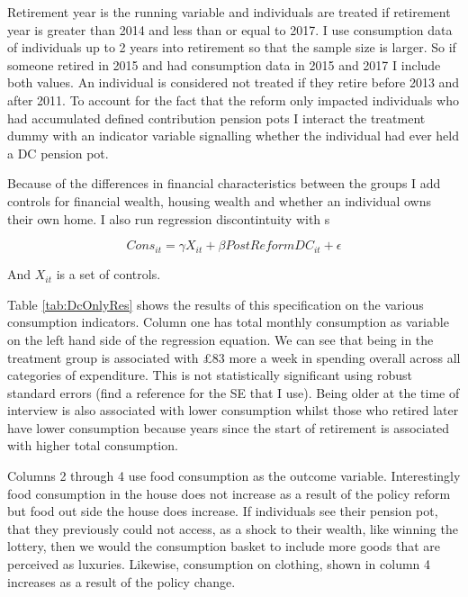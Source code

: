 \documentclass[12pt]{article}
\begin{document}
Retirement year is the running variable and individuals are treated if retirement year is greater than 2014 and less than
or equal to 2017. I use consumption data of individuals up to 2 years into retirement so that the sample size is larger.
So if someone retired in 2015 and had consumption data in 2015 and 2017 I include both values. An individual is considered
not treated if they retire before 2013 and after 2011.  To account for the fact
that the reform only impacted individuals who had accumulated defined contribution pension pots I interact the treatment dummy with
an indicator variable signalling whether the individual had ever held a DC pension pot.

Because of the differences in financial characteristics between the groups I add controls for financial wealth, housing wealth
and whether an individual owns their own home. I also run regression discontintuity with s

\begin{equation*}
    Cons_{it} =  \gamma X_{it} + \beta PostReformDC_{it} + \epsilon
\end{equation*}

And $X_{it}$ is a set of controls.



\begin{landscape}
    
\end{landscape}


Table \ref{tab:DcOnlyRes} shows the results of this specification on the various consumption indicators.
Column one has total monthly consumption as variable on the left hand side of the regression equation.
We can see that being in the treatment group is associated with £83 more a week in spending
overall across all categories of expenditure. This is not statistically significant using
robust standard errors (find a reference for the SE that I use). Being older at the time of interview
is also associated with lower consumption whilst those who retired later have lower consumption
because years since the start of retirement is associated with higher total consumption.

Columns 2 through 4 use food consumption as the outcome variable. Interestingly food consumption
in the house does not increase as a result of the policy reform but food out side the house does
increase. If individuals see their pension pot, that they previously could not access, as a
shock to their wealth, like winning the lottery, then we would the consumption basket to
include more goods that are perceived as luxuries. Likewise, consumption on clothing, shown in
column 4 increases as a result of the policy change.
\end{document}
